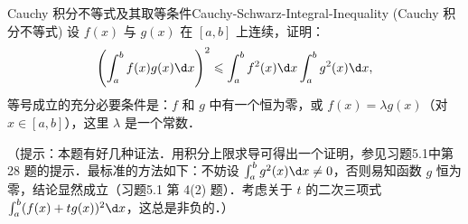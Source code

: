 \begin{problem}{Cauchy 积分不等式及其取等条件}{Cauchy-Schwarz-Integral-Inequality}
    (Cauchy 积分不等式) 设 $f(x)$ 与 $g(x)$ 在 $[a, b]$ 上连续，证明：
    \begin{equation}
        \left(\int_a^b f(x)g(x)\d x\right)^2 \leqslant \int_a^b f^2(x)\d x \int_a^b g^2(x)\d x,
    \end{equation}
    等号成立的充分必要条件是：$f$ 和 $g$ 中有一个恒为零，或 $f(x) = \lambda g(x)$（对 $x \in [a, b]$），这里 $\lambda$ 是一个常数．

    （提示：本题有好几种证法．用积分上限求导可得出一个证明，参见习题5.1中第 28 题的提示．最标准的方法如下：不妨设 $\int_a^b g^2(x)\d x \neq 0$，否则易知函数 $g$ 恒为零，结论显然成立（习题5.1 第 4(2) 题）．考虑关于 $t$ 的二次三项式 $\int_a^b (f(x) + tg(x))^2 \d x$，这总是非负的．）
\end{problem}

